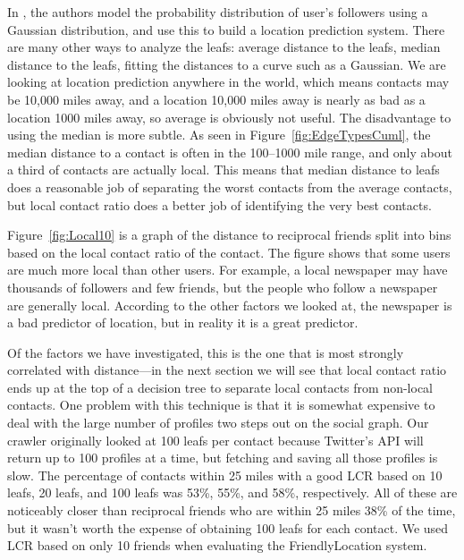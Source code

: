 \documentclass{sig-alternate}
\begin{document}
In \cite{li2012towards}, the authors model the probability distribution of
user's followers using a Gaussian distribution, and use this to build a
location prediction system.
%
There are many other ways to analyze the leafs: average distance to the leafs,
median distance to the leafs, fitting the distances to a curve such as a
Gaussian.
%
We are looking at location prediction anywhere in the world, which means
contacts may be 10,000 miles away, and a location 10,000 miles away is nearly
as bad as a location 1000 miles away, so average is obviously not useful.
%
The disadvantage to using the median is more subtle.
%
As seen in Figure~\ref{fig:EdgeTypesCuml}, the median distance to a contact is
often in the 100--1000 mile range, and only about a third of contacts are
actually local.
%
This means that median distance to leafs does a reasonable job of separating the
worst contacts from the average contacts, but local contact ratio does a better
job of identifying the very best contacts.

Figure~\ref{fig:Local10} is a graph of the distance to reciprocal friends split
into bins based on the local contact ratio of the contact.
%
The figure shows that some users are much more local than other users.
%
For example, a local newspaper may have thousands of followers and few friends,
but the people who follow a newspaper are generally local.
%
According to the other factors we looked at, the newspaper is a bad predictor
of location, but in reality it is a great predictor.

Of the factors we have investigated, this is the one that is most strongly
correlated with distance---in the next section we will see that local contact
ratio ends up at the top of a decision tree to separate local contacts from
non-local contacts.
%
One problem with this technique is that it is somewhat expensive to deal with
the large number of profiles two steps out on the social graph.
%
Our crawler originally looked at 100 leafs per contact because Twitter's API
will return up to 100 profiles at a time, but fetching and saving all those
profiles is slow.
%
%
The percentage of contacts within 25 miles with a good LCR based on 10 leafs,
20 leafs, and 100 leafs was 53\%, 55\%, and 58\%, respectively.
%
All of these are noticeably closer than reciprocal friends who are within 25
miles 38\% of the time, but it wasn't worth the expense of obtaining 100 leafs
for each contact.
%
We used LCR based on only 10 friends when evaluating the FriendlyLocation
system.
\end{document}
